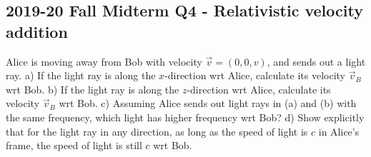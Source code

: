 \documentclass[12pt]{book} %
\numberwithin{equation}{chapter}
\begin{document}
\subsection*{2019-20 Fall Midterm Q4 - Relativistic velocity addition}
Alice is moving away from Bob with velocity $\vec{v}=\left(0, 0, v\right)$, and sends out a light ray.\bigskip\newline
a) If the light ray is along the $x$-direction wrt Alice, calculate its velocity $\vec{v}_{B}$ wrt Bob.\bigskip\newline
b) If the light ray is along the $z$-direction wrt Alice, calculate its velocity $\vec{v}_{B}$ wrt Bob.\bigskip\newline
c) Assuming Alice sends out light rays in (a) and (b) with the same frequency, which light has higher frequency wrt Bob?\bigskip\newline
d) Show explicitly that for the light ray in any direction, as long as the speed of light is $c$ in Alice's frame, the speed of light is still $c$ wrt Bob.
\end{document}
